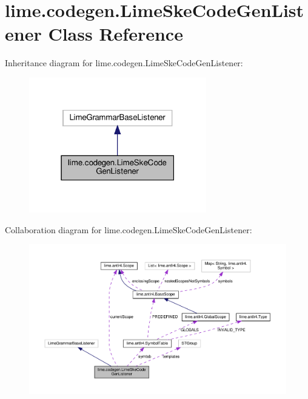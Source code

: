 \hypertarget{classlime_1_1codegen_1_1LimeSkeCodeGenListener}{}\section{lime.\+codegen.\+Lime\+Ske\+Code\+Gen\+Listener Class Reference}
\label{classlime_1_1codegen_1_1LimeSkeCodeGenListener}


Inheritance diagram for lime.\+codegen.\+Lime\+Ske\+Code\+Gen\+Listener\+:
\nopagebreak
\begin{figure}[H]
\begin{center}
\leavevmode
\includegraphics[width=219pt]{classlime_1_1codegen_1_1LimeSkeCodeGenListener__inherit__graph}
\end{center}
\end{figure}


Collaboration diagram for lime.\+codegen.\+Lime\+Ske\+Code\+Gen\+Listener\+:
\nopagebreak
\begin{figure}[H]
\begin{center}
\leavevmode
\includegraphics[width=350pt]{classlime_1_1codegen_1_1LimeSkeCodeGenListener__coll__graph}
\end{center}
\end{figure}
